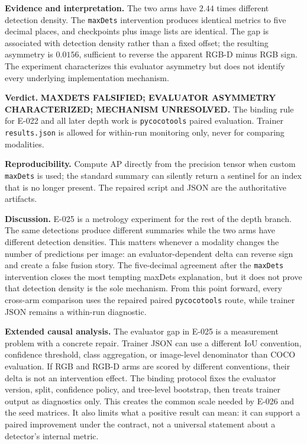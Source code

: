 \documentclass[preprint,12pt]{elsarticle}
\begin{document}
\textbf{Evidence and interpretation.} The two arms have \(2.44\) times
different detection density. The \texttt{maxDets} intervention produces
identical metrics to five decimal places, and checkpoints plus image lists
are identical. The gap is associated with detection density rather than a
fixed offset; the resulting asymmetry is \(0.0156\), sufficient to reverse the
apparent RGB-D minus RGB sign. The experiment characterizes this evaluator
asymmetry but does not identify every underlying implementation mechanism.

\textbf{Verdict.} \textbf{MAXDETS FALSIFIED; EVALUATOR ASYMMETRY
CHARACTERIZED; MECHANISM UNRESOLVED.} The binding rule for E-022 and all later depth work is
\texttt{pycocotools} paired evaluation. Trainer \texttt{results.json} is
allowed for within-run monitoring only, never for comparing modalities.

\textbf{Reproducibility.} Compute AP directly from the precision tensor when
custom \texttt{maxDets} is used; the standard summary can silently return a
sentinel for an index that is no longer present. The repaired script and JSON
are the authoritative artifacts.

\textbf{Discussion.} E-025 is a metrology experiment for the rest of the
depth branch. The same detections produce different summaries while the
two arms have different detection densities. This matters whenever a modality changes the number of
predictions per image: an evaluator-dependent delta can reverse sign and
create a false fusion story. The five-decimal agreement after the
\texttt{maxDets} intervention closes the most tempting maxDets explanation,
but it does not prove that detection density is the sole mechanism. From this
point forward, every cross-arm comparison uses the repaired paired
\texttt{pycocotools} route, while trainer JSON remains a within-run diagnostic.

\textbf{Extended causal analysis.} The evaluator gap in E-025 is a
measurement problem with a concrete repair. Trainer JSON can use a different
IoU convention, confidence threshold, class aggregation, or image-level
denominator than COCO evaluation. If RGB and RGB-D arms are scored by
different conventions, their delta is not an intervention effect. The
binding protocol fixes the evaluator version, split, confidence policy, and
tree-level bootstrap, then treats trainer output as diagnostics only. This
creates the common scale needed by E-026 and the seed matrices. It also limits
what a positive result can mean: it can support a paired improvement under the
contract, not a universal statement about a detector's internal metric.
\end{document}
